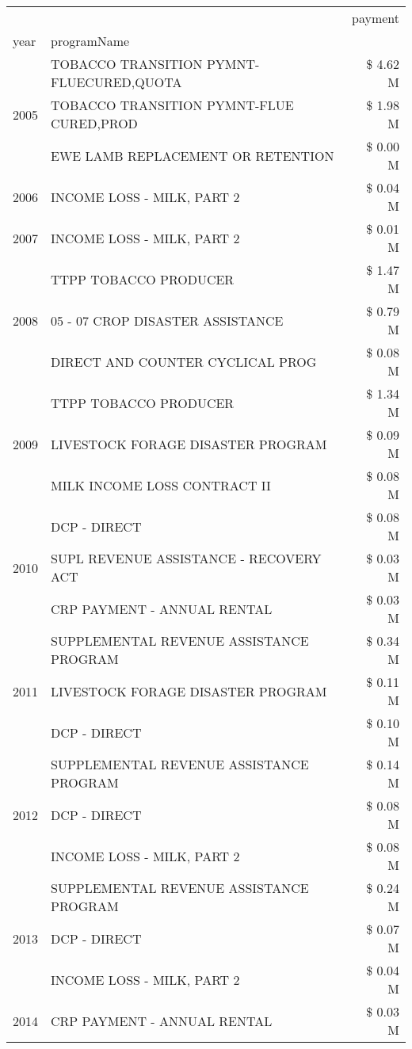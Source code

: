 \begin{tabular}{llr}
\toprule
 &  & payment \\
year & programName &  \\
\midrule
\multirow[t]{3}{*}{2005} & TOBACCO TRANSITION PYMNT-FLUECURED,QUOTA & \$ 4.62 M \\
 & TOBACCO TRANSITION PYMNT-FLUE CURED,PROD & \$ 1.98 M \\
 & EWE LAMB REPLACEMENT OR RETENTION & \$ 0.00 M \\
\cline{1-3}
2006 & INCOME LOSS - MILK, PART 2 & \$ 0.04 M \\
\cline{1-3}
2007 & INCOME LOSS - MILK, PART 2 & \$ 0.01 M \\
\cline{1-3}
\multirow[t]{3}{*}{2008} & TTPP TOBACCO PRODUCER & \$ 1.47 M \\
 & 05 - 07 CROP DISASTER ASSISTANCE & \$ 0.79 M \\
 & DIRECT AND COUNTER CYCLICAL PROG & \$ 0.08 M \\
\cline{1-3}
\multirow[t]{3}{*}{2009} & TTPP TOBACCO PRODUCER & \$ 1.34 M \\
 & LIVESTOCK FORAGE DISASTER  PROGRAM & \$ 0.09 M \\
 & MILK INCOME LOSS CONTRACT II & \$ 0.08 M \\
\cline{1-3}
\multirow[t]{3}{*}{2010} & DCP - DIRECT & \$ 0.08 M \\
 & SUPL REVENUE ASSISTANCE - RECOVERY ACT & \$ 0.03 M \\
 & CRP PAYMENT - ANNUAL RENTAL & \$ 0.03 M \\
\cline{1-3}
\multirow[t]{3}{*}{2011} & SUPPLEMENTAL REVENUE ASSISTANCE PROGRAM & \$ 0.34 M \\
 & LIVESTOCK FORAGE DISASTER PROGRAM & \$ 0.11 M \\
 & DCP - DIRECT & \$ 0.10 M \\
\cline{1-3}
\multirow[t]{3}{*}{2012} & SUPPLEMENTAL REVENUE ASSISTANCE PROGRAM & \$ 0.14 M \\
 & DCP - DIRECT & \$ 0.08 M \\
 & INCOME LOSS - MILK, PART 2 & \$ 0.08 M \\
\cline{1-3}
\multirow[t]{3}{*}{2013} & SUPPLEMENTAL REVENUE ASSISTANCE PROGRAM & \$ 0.24 M \\
 & DCP - DIRECT & \$ 0.07 M \\
 & INCOME LOSS - MILK, PART 2 & \$ 0.04 M \\
\cline{1-3}
\multirow[t]{3}{*}{2014} & CRP PAYMENT - ANNUAL RENTAL & \$ 0.03 M \\

\end{tabular}
